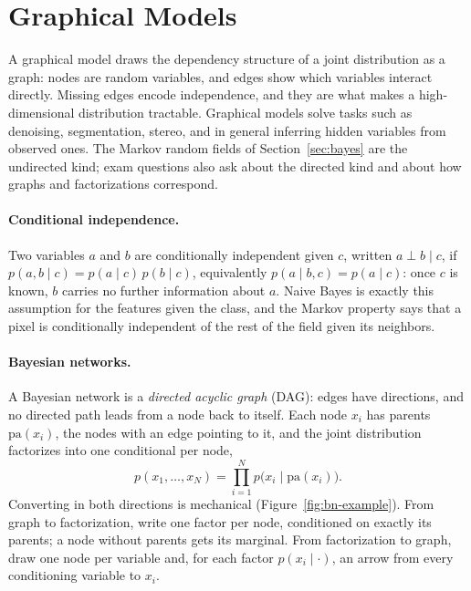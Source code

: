 \section{Graphical Models}
\label{app:graphical}

A graphical model draws the dependency structure of a joint distribution as a
graph: nodes are random variables, and edges show which variables interact
directly. Missing edges encode independence, and they are what makes a
high-dimensional distribution tractable. Graphical models solve tasks such as
denoising, segmentation, stereo, and in general inferring hidden variables from
observed ones. The Markov random fields of Section~\ref{sec:bayes} are the
undirected kind; exam questions also ask about the directed kind and about how
graphs and factorizations correspond.

\paragraph{Conditional independence.}
Two variables $a$ and $b$ are conditionally independent given $c$, written
$a\perp b\mid c$, if $p(a,b\mid c) = p(a\mid c)\,p(b\mid c)$, equivalently
$p(a\mid b,c) = p(a\mid c)$: once $c$ is known, $b$ carries no further
information about $a$. Naive Bayes is exactly this assumption for the features
given the class, and the Markov property says that a pixel is conditionally
independent of the rest of the field given its neighbors.

\paragraph{Bayesian networks.}
A Bayesian network is a \emph{directed acyclic graph} (DAG): edges have
directions, and no directed path leads from a node back to itself. Each node
$x_i$ has parents $\mathrm{pa}(x_i)$, the nodes with an edge pointing to it, and
the joint distribution factorizes into one conditional per node,
\begin{equation}
  p(x_1,\dots,x_N) = \prod_{i=1}^{N} p\bigl(x_i\mid \mathrm{pa}(x_i)\bigr).
\end{equation}
\noindent
Converting in both directions is mechanical (Figure~\ref{fig:bn-example}). From
graph to factorization, write one factor per node, conditioned on exactly its
parents; a node without parents gets its marginal. From factorization to graph,
draw one node per variable and, for each factor $p(x_i\mid\cdot)$, an arrow
from every conditioning variable to $x_i$.


